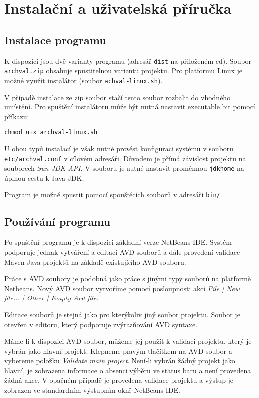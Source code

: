 \chapter{Instalační a uživatelská příručka}

\section{Instalace programu}

K dispozici jsou dvě varianty programu (adresář \verb+dist+ na přiloženém cd). Soubor \verb+archval.zip+ obsahuje spustitelnou variantu projektu. Pro platformu Linux je možné využít instalátor (soubor \verb+achval-linux.sh+).

V případě instalace ze zip soubor stačí tento soubor rozbalit do vhodného umístění. Pro spuštění instalátoru může být nutná nastavit executable bit pomocí příkazu:

\begin{verbatim}
chmod u+x archval-linux.sh
\end{verbatim}

U obou typů instalací je však nutné provést konfiguraci systému v souboru \verb+etc/archval.conf+ v cílovém adresáři. Důvodem je přímá závislost projektu na souborech \emph{Sun JDK API}. V souboru je nutné nastavit proměnnou \verb+jdkhome+ na úplnou cestu k Java JDK.

Program je možné spustit pomocí spouštěcích souborů v adresáři \verb+bin/+.

\section{Používání programu}
Po spuštění programu je k dispozici základní verze NetBeans IDE. Systém podporuje jednak vytváření a editaci AVD souborů a dále provedení validace Maven Java projektů na základě existujícího AVD souboru.

Práce s AVD soubory je podobná jako práce s jinými typy souborů na platformě Netbeans. Nový AVD soubor vytvoříme pomocí posloupnosti akcí \emph{File | New file... | Other | Empty Avd file}.

Editace souborů je stejná jako pro kterýkoliv jiný soubor projektu. Soubor je otevřen v editoru, který podporuje zvýrazňování AVD syntaxe.

Máme-li k dispozici AVD soubor, můžeme jej použít k validaci projektu, který je vybrán jako hlavní projekt. Klepneme pravým tlačítkem na AVD soubor a vybereme položku \emph{Validate main project}. Není-li vybrán žádný projekt jako hlavní, je zobrazena informace o absenci výběru ve status baru a není provedena žádná akce. V opačném případě je provedena validace projektu a výstup je zobrazen ve standardním výstupním okně NetBeans IDE.

